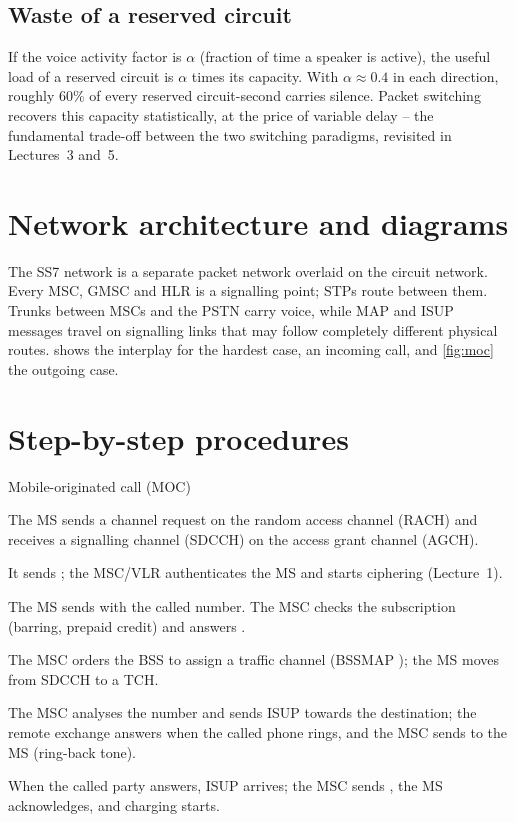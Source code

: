 \documentclass[11pt,a4paper]{article}
\begin{document}
\subsection{Waste of a reserved circuit}
If the voice activity factor is $\alpha$ (fraction of time a speaker is active), the
useful load of a reserved circuit is $\alpha$ times its capacity. With $\alpha\approx0.4$ in
each direction, roughly 60\% of every reserved circuit-second carries silence. Packet
switching recovers this capacity statistically, at the price of variable delay -- the
fundamental trade-off between the two switching paradigms, revisited in Lectures~3 and~5.

\section{Network architecture and diagrams}
The SS7 network is a separate packet network overlaid on the circuit network. Every MSC,
GMSC and HLR is a signalling point; STPs route between them. Trunks between MSCs and the
PSTN carry voice, while MAP and ISUP messages travel on signalling links that may follow
completely different physical routes.  shows the interplay for the hardest
case, an incoming call, and \cref{fig:moc} the outgoing case.

\section{Step-by-step procedures}

\begin{procedurebox}{Mobile-originated call (MOC)}\label{proc:moc}
\begin{steps}
  \item The MS sends a channel request on the random access channel (RACH) and receives a
        signalling channel (SDCCH) on the access grant channel (AGCH).
  \item It sends ; the MSC/VLR authenticates the MS and starts
        ciphering (Lecture~1).
  \item The MS sends  with the called number. The MSC checks the subscription
        (barring, prepaid credit) and answers .
  \item The MSC orders the BSS to assign a traffic channel (BSSMAP );
        the MS moves from SDCCH to a TCH.
  \item The MSC analyses the number and sends ISUP  towards the destination; the
        remote exchange answers  when the called phone rings, and the MSC sends
         to the MS (ring-back tone).
  \item When the called party answers, ISUP  arrives; the MSC sends ,
        the MS acknowledges, and charging starts.
\end{steps}
\end{procedurebox}
\end{document}
